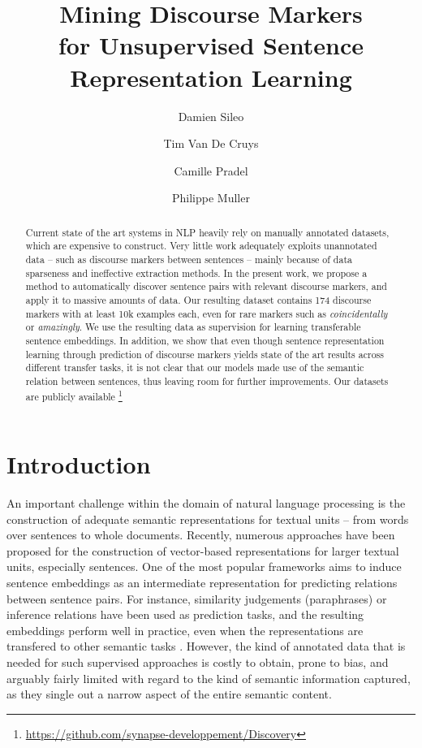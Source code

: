 \documentclass[11pt,a4paper]{article}
\title{Mining Discourse Markers\\for Unsupervised Sentence Representation Learning
}
\author[3,1]{Damien Sileo}
\author[2]{Tim Van De Cruys}
\author[1]{Camille Pradel}
\author[3]{Philippe Muller}
\affil[1]{Synapse D\'eveloppement, Toulouse, France}
\affil[2]{IRIT, CNRS, France} \vspace{-2ex}
\affil[3]{IRIT, University of Toulouse, France}
\affil[ ]{\url{damien.sileo@synapse-fr.com}}
\date{}
\begin{document}
\maketitle
\vspace*{-2em}
\begin{abstract}
Current state of the art systems in NLP heavily rely on manually annotated datasets, which are expensive to construct. Very little work adequately exploits unannotated data -- such as discourse markers between sentences -- mainly because of data sparseness and ineffective extraction methods. In the present work, we propose a method to automatically discover sentence pairs with relevant discourse markers, and apply it to massive amounts of data. Our resulting dataset contains 174 discourse markers with at least 10{\sc k} examples each, even for rare markers such as \textit{coincidentally} or \textit{amazingly}. We use the resulting data as supervision for learning transferable sentence embeddings. 
In addition, we show that even though sentence representation learning through prediction of discourse markers yields state of the art results across different transfer tasks, it is not clear that our models made use of the semantic relation between sentences, thus leaving room for further improvements.
Our datasets are publicly available \footnote{\url{https://github.com/synapse-developpement/Discovery}}




\end{abstract}
\section{Introduction}

An important challenge within the domain of natural language processing is the construction of adequate semantic representations
for textual units -- from words over sentences to whole documents. 
Recently, numerous approaches have been proposed for the construction of vector-based representations for larger textual units, especially sentences. 
One of the most popular frameworks aims to induce sentence embeddings as an intermediate representation for predicting relations between sentence pairs. For instance, similarity judgements (paraphrases) or inference relations have been used as prediction tasks, and the resulting embeddings perform well in practice, even when the representations are transfered to other semantic tasks \citep{Conneau2017}. However, the kind of annotated data that is needed for such supervised approaches is costly to obtain, prone to bias, and arguably fairly limited with regard to the kind of semantic information captured, as they single out a narrow aspect of the entire semantic content. 
\end{document}
